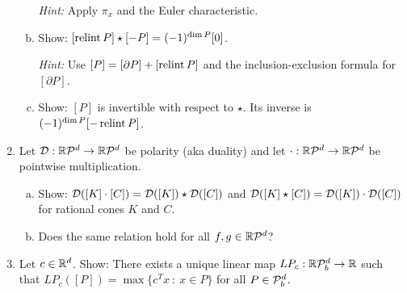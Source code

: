 \begin{enumerate}
\begin{enumerate}[(a)]
      \emph{Hint:} Apply $\pi_x$ and the Euler characteristic.

    \item Show: $[\operatorname{relint} P] \star [-P] = (-1)^{\dim P} [0]$.

      \emph{Hint:} Use $[P] = [\partial P] + [\operatorname{relint} P]$ and the inclusion-exclusion formula for $[\partial P]$.

    \item Show: $[P]$ is invertible with respect to $\star$.
      Its inverse is $(-1)^{\dim P} [-\operatorname{relint} P]$.
  \end{enumerate}


  \item Let $\mathcal{D} : \mathbb{R} \mathcal{P}^d \to \mathbb{R} \mathcal{P}^d$ be polarity (aka duality) and let $\cdot : \mathbb{R} \mathcal{P}^d \to \mathbb{R} \mathcal{P}^d$ be pointwise multiplication.
    \begin{enumerate}[(a)]
      \item
        Show: $\mathcal{D}([K] \cdot [C]) = \mathcal{D}([K]) \star \mathcal{D}([C])$ and $\mathcal{D}([K] \star [C]) = \mathcal{D}([K]) \cdot \mathcal{D}([C])$ for rational cones $K$ and $C$.

      \item
        Does the same relation hold for all $f, g \in \mathbb{R} \mathcal{P}^d$?
    \end{enumerate}

  \item Let $c \in \mathbb{R}^d$.
    Show: There exists a unique linear map $LP_c: \mathbb{R} \mathcal{P}_b^d \to \mathbb{R}$
    such that $LP_c([P]) = \max\{ c^Tx ~:~ x \in P \}$ for all $P \in \mathcal{P}_b^d$.
\end{enumerate}
